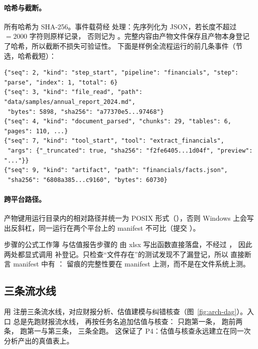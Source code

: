 \paragraph{哈希与截断。}所有哈希为 SHA-256。事件载荷经  处理：先序列化为 JSON，若长度不超过 ${}=2000$ 字符则原样记录，
否则记为 。完整内容由产物文件保存且产物本身登记了哈希，所以截断不损失可验证性。
下面是样例全流程运行的前几条事件（节选，哈希截短）：

\begin{lstlisting}
{"seq": 2, "kind": "step_start", "pipeline": "financials", "step": "parse", "index": 1, "total": 6}
{"seq": 3, "kind": "file_read", "path": "data/samples/annual_report_2024.md",
 "bytes": 5898, "sha256": "a77370e5...97468"}
{"seq": 4, "kind": "document_parsed", "chunks": 29, "tables": 6, "pages": 110, ...}
{"seq": 7, "kind": "tool_start", "tool": "extract_financials",
 "args": {"_truncated": true, "sha256": "f2fe6405...1d04f", "preview": "..."}}
{"seq": 9, "kind": "artifact", "path": "financials/facts.json",
 "sha256": "6808a385...c9160", "bytes": 60730}
\end{lstlisting}

\paragraph{跨平台路径。}产物键用运行目录内的相对路径并统一为 POSIX 形式（），否则 Windows 上会写出反斜杠，同一运行在两个平台上的 manifest 不可比（提交 ）。

\begin{insight}
 步骤的公式工作簿  与估值报告步骤的  由 xlsx 写出函数直接落盘，不经过 ，
因此两处都显式调用  补登记。只检查“文件存在”的测试发现不了漏登记，所以  直接断言 manifest 中有 ：
留痕的完整性要在 manifest 上测，而不是在文件系统上测。
\end{insight}

\subsection{三条流水线}
\label{sec:arch-pipelines}

 用  注册三条流水线，对应财报分析、估值建模与纠错核查（图~\ref{fig:arch-dag}）。入口  总是先跑财报流水线，
再按任务名追加估值与核查： 只跑第一条， 跑前两条， 跑第一与第三条， 三条全跑。
这保证了 P4：估值与核查永远建立在同一次分析产出的真值表上。

